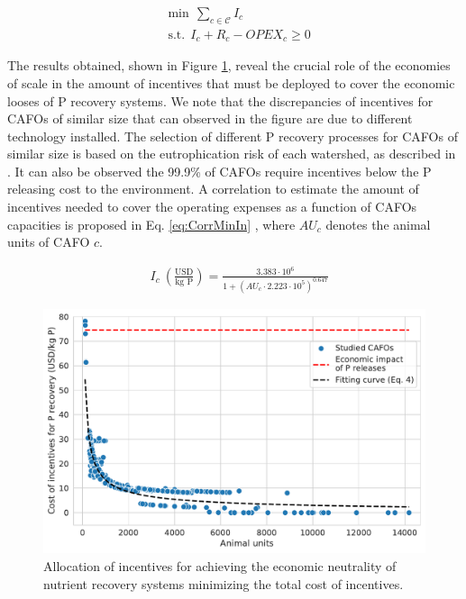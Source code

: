 \begin{refsection}[referencesCh5]
\begin{subequations}
	\begin{align}
	& \text{min} \ \ \sum_{c \in \mathcal{C}} I_{c}  \label{eq:objMinIn} \\
	& \text{s.t.} \ \ I_{c} + R_{c} - OPEX_{c} \geq 0 \label{eq:cons1MinIn}
	\end{align}
\end{subequations}

The results obtained, shown in Figure \ref{fig:MinIncent}, reveal the crucial role of the economies of scale in the amount of incentives that must be deployed to cover the economic looses of P recovery systems. We note that the discrepancies of incentives for CAFOs of similar size that can observed in the figure are due to different technology installed. The selection of different P recovery processes for CAFOs of similar size is based on the eutrophication risk of each watershed, 
as described in \citet{Tool}.
It can also be observed the 99.9\% of CAFOs require incentives below the P releasing cost to the environment. A correlation to estimate the amount of incentives needed to cover the operating expenses as a function of CAFOs capacities is proposed in Eq. \ref{eq:CorrMinIn} , where $AU_{c}$ denotes the animal units of CAFO $c$.

\begin{align}
& I_{c} \ \left(\frac{\text{USD}}{\text{kg P}}\right) = \frac{3.383 \cdot 10^6}{1+\left(AU_{c} \cdot 2.223\cdot 10^5 \right)^{0.647}} \label{eq:CorrMinIn} 
\end{align}

\begin{figure}[h]
	\centering
	\includegraphics[width=0.7\linewidth, trim=0cm 0cm 0cm 0cm, clip]{gfx/Chapter5/MinIncent.pdf}
	\caption{Allocation of incentives for achieving the economic neutrality of nutrient recovery systems minimizing the total cost of incentives.}
	\label{fig:MinIncent}
\end{figure}


\end{refsection}
